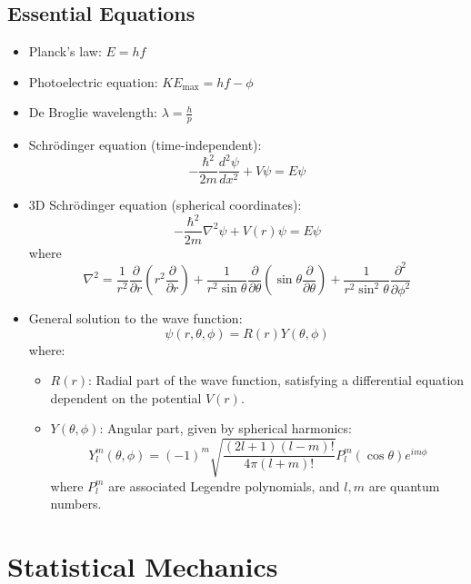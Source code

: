 \documentclass{article}
\newcommand{\eqbox}[1]{\begin{tcolorbox}[colback=gray!10] #1 \end{tcolorbox}}
\begin{document}
\subsection{Essential Equations}
\eqbox{
\begin{itemize}
    \item Planck's law: $E = hf$
    \item Photoelectric equation: $KE_{\text{max}} = hf - \phi$
    \item De Broglie wavelength: $\lambda = \frac{h}{p}$
    \item Schrödinger equation (time-independent): 
    \[
    -\frac{\hbar^2}{2m}\frac{d^2\psi}{dx^2} + V\psi = E\psi
    \]
    \item 3D Schrödinger equation (spherical coordinates):
    \[
    -\frac{\hbar^2}{2m} \nabla^2 \psi + V(r)\psi = E\psi
    \]
    where 
    \[
    \nabla^2 = \frac{1}{r^2} \frac{\partial}{\partial r} \left( r^2 \frac{\partial}{\partial r} \right) 
    + \frac{1}{r^2 \sin\theta} \frac{\partial}{\partial \theta} \left( \sin\theta \frac{\partial}{\partial \theta} \right) 
    + \frac{1}{r^2 \sin^2\theta} \frac{\partial^2}{\partial \phi^2}
    \]
    \item General solution to the wave function:
    \[
    \psi(r, \theta, \phi) = R(r) Y(\theta, \phi)
    \]
    where:
    \begin{itemize}
        \item $R(r)$: Radial part of the wave function, satisfying a differential equation dependent on the potential $V(r)$.
        \item $Y(\theta, \phi)$: Angular part, given by spherical harmonics:
        \[
        Y_l^m(\theta, \phi) = (-1)^m \sqrt{\frac{(2l+1)(l-m)!}{4\pi (l+m)!}} P_l^m(\cos\theta)e^{im\phi}
        \]
        where $P_l^m$ are associated Legendre polynomials, and $l, m$ are quantum numbers.
    \end{itemize}
\end{itemize}
}


\section{Statistical Mechanics}
\end{document}
